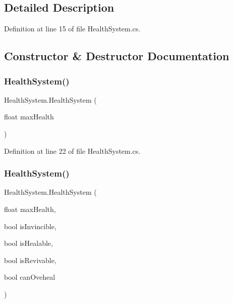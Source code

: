 \subsection{Detailed Description}


Definition at line 15 of file Health\+System.\+cs.



\subsection{Constructor \& Destructor Documentation}
\mbox{\label{class_health_system_a259eb4ec7b1886fd490ccd97e8d14929}} 
\subsubsection{\texorpdfstring{Health\+System()}{HealthSystem()}\hspace{0.1cm}{\footnotesize\ttfamily [1/2]}}
{\footnotesize\ttfamily Health\+System.\+Health\+System (\begin{DoxyParamCaption}\item[{float}]{max\+Health }\end{DoxyParamCaption})}



Definition at line 22 of file Health\+System.\+cs.

\mbox{\label{class_health_system_a632e30e7613cc00bd282819619199599}} 
\subsubsection{\texorpdfstring{Health\+System()}{HealthSystem()}\hspace{0.1cm}{\footnotesize\ttfamily [2/2]}}
{\footnotesize\ttfamily Health\+System.\+Health\+System (\begin{DoxyParamCaption}\item[{float}]{max\+Health,  }\item[{bool}]{is\+Invincible,  }\item[{bool}]{is\+Healable,  }\item[{bool}]{is\+Revivable,  }\item[{bool}]{can\+Oveheal }\end{DoxyParamCaption})}



